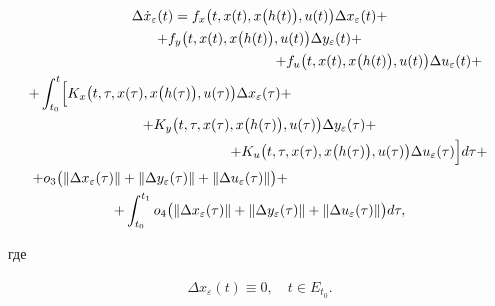 \begin{multline}

\label{mans:eq13}

\Delta \dot{x}_{\varepsilon}(t)=f_{x} \bigl(t, x(t), x\bigl(h(t)\bigr), u(t)\bigr) \Delta x_{\varepsilon}(t)+

\\

+

f_{y} \bigl(t, x(t), x\bigl(h(t)\bigr), u(t)\bigr) \Delta y_{\varepsilon}(t)+  \\

\hspace{6cm}

 +f_{u} \bigl(t, x(t), x\bigl(h(t)\bigr), u(t)\bigr) \Delta u_{\varepsilon}(t)+ \\ 

 +\int_{t_{0}}^{t} 

 \Bigl[ K_{x} \bigl(t, \tau, x(\tau), x\bigl(h(\tau)\bigr), u(\tau)\bigr) \Delta x_{\varepsilon}(\tau) + \hspace{5cm} \\

 +K_{y}\bigl(t, \tau, x(\tau), x\bigl(h(\tau)\bigr), u(\tau)\bigr) \Delta y_{\varepsilon}(\tau)+ \\

\hspace{5cm} 

+   K_{u} \bigl(t, \tau, x(\tau), x\bigl(h(\tau)\bigr), u(\tau)\bigr) \Delta u_{\varepsilon}(\tau) \Bigr]  d\tau + \\

 +o_{3} \bigl( \Vert \Delta x_{\varepsilon}(\tau) \Vert +\Vert \Delta y_{\varepsilon}(\tau) \Vert+\Vert \Delta u_{\varepsilon}(\tau) \Vert  \bigr) +\hspace{5cm} 

\\ 

 +\int_{t_{0}}^{t_{1}} o_{4} \bigl( \Vert \Delta x_{\varepsilon}(\tau) \Vert +\Vert \Delta y_{\varepsilon}(\tau) \Vert+\Vert \Delta u_{\varepsilon}(\tau) \Vert  \bigr) d\tau , 

\end{multline}

где

\begin{gather}

\label{mans:eq14}

\Delta x_{\varepsilon}(t)\equiv 0, \quad  t\in E_{t_{0}} .

\end{gather}



